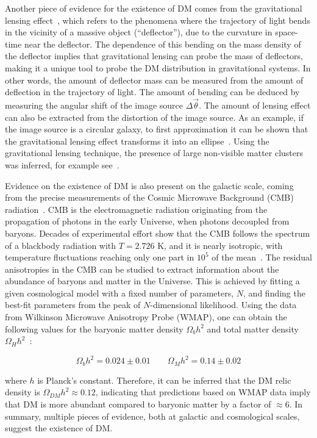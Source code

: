 Another piece of evidence for the existence of DM comes from the gravitational lensing effect~\cite{Mellier:1998pk}, which refers to the
phenomena where the trajectory of light bends in the vicinity of a massive object (``deflector''), due to the curvature in 
space-time near the deflector. The dependence of this bending on the mass density of the deflector implies that gravitational
lensing can probe the mass of deflectors, making it a unique tool to probe the DM distribution in gravitational systems. In other words,
the amount of deflector mass can be measured from the amount of deflection in the trajectory of light. The amount of bending can be
deduced by measuring the angular shift of the image source $\Delta\vec{\theta}$. The amount of lensing effect can also be extracted from
the distortion of the image source. As an example, if the image source is a circular galaxy, to first approximation it can be shown that
the gravitational lensing effect transforms it into an ellipse~\cite{Mellier:1998pk}. Using the gravitational lensing technique, the
presence of large non-visible matter clusters was inferred, for example see~\cite{1988ApJ...332...75N}.

Evidence on the existence of DM is also present on the galactic scale, coming from the precise measurements of the Cosmic
Microwave Background (CMB) radiation~\cite{Hu:1995kot}. CMB is the electromagnetic radiation originating from the propagation of photons
in the early Universe, when photons decoupled from baryons. Decades of experimental effort show that the CMB follows 
the spectrum of a blackbody radiation with $T=2.726$ K, and it is nearly isotropic,
with temperature fluctuations reaching only one part in $10^{5}$ of the mean~\cite{Bertone:2004pz}.
The residual anisotropies in the CMB can be studied to extract information about the abundance of baryons and matter in the Universe. 
This is achieved by fitting
a given cosmological model with a fixed number of parameters, $N$, and finding the best-fit parameters from the peak of $N$-dimensional
likelihood. Using the data from Wilkinson Microwave Anisotropy Probe (WMAP), one can obtain the following values for the baryonic matter
density $\Omega_{b} h^{2}$ and total matter density $\Omega_{H} h^{2}$~\cite{Bertone:2004pz}:

\begin{equation}
    \Omega_{b} h^{2} = 0.024 \pm 0.01 \qquad \Omega_{M} h^{2} = 0.14 \pm 0.02
\end{equation}

where $h$ is Planck's constant. Therefore, it can be inferred that the DM relic density is $\Omega_{DM} h^2 \approx 0.12$, indicating that
predictions based on WMAP data imply that DM is more abundant compared to baryonic matter by a factor of $\approx 6$. In summary, multiple
pieces of evidence, both at galactic and cosmological scales, suggest the existence of DM. 


